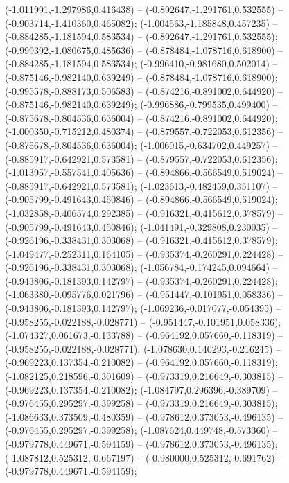  (-1.011991,-1.297986,0.416438) -- (-0.892647,-1.291761,0.532555) -- (-0.903714,-1.410360,0.465082);
 (-1.004563,-1.185848,0.457235) -- (-0.884285,-1.181594,0.583534) -- (-0.892647,-1.291761,0.532555);
 (-0.999392,-1.080675,0.485636) -- (-0.878484,-1.078716,0.618900) -- (-0.884285,-1.181594,0.583534);
 (-0.996410,-0.981680,0.502014) -- (-0.875146,-0.982140,0.639249) -- (-0.878484,-1.078716,0.618900);
 (-0.995578,-0.888173,0.506583) -- (-0.874216,-0.891002,0.644920) -- (-0.875146,-0.982140,0.639249);
 (-0.996886,-0.799535,0.499400) -- (-0.875678,-0.804536,0.636004) -- (-0.874216,-0.891002,0.644920);
 (-1.000350,-0.715212,0.480374) -- (-0.879557,-0.722053,0.612356) -- (-0.875678,-0.804536,0.636004);
 (-1.006015,-0.634702,0.449257) -- (-0.885917,-0.642921,0.573581) -- (-0.879557,-0.722053,0.612356);
 (-1.013957,-0.557541,0.405636) -- (-0.894866,-0.566549,0.519024) -- (-0.885917,-0.642921,0.573581);
 (-1.023613,-0.482459,0.351107) -- (-0.905799,-0.491643,0.450846) -- (-0.894866,-0.566549,0.519024);
 (-1.032858,-0.406574,0.292385) -- (-0.916321,-0.415612,0.378579) -- (-0.905799,-0.491643,0.450846);
 (-1.041491,-0.329808,0.230035) -- (-0.926196,-0.338431,0.303068) -- (-0.916321,-0.415612,0.378579);
 (-1.049477,-0.252311,0.164105) -- (-0.935374,-0.260291,0.224428) -- (-0.926196,-0.338431,0.303068);
 (-1.056784,-0.174245,0.094664) -- (-0.943806,-0.181393,0.142797) -- (-0.935374,-0.260291,0.224428);
 (-1.063380,-0.095776,0.021796) -- (-0.951447,-0.101951,0.058336) -- (-0.943806,-0.181393,0.142797);
 (-1.069236,-0.017077,-0.054395) -- (-0.958255,-0.022188,-0.028771) -- (-0.951447,-0.101951,0.058336);
 (-1.074327,0.061673,-0.133788) -- (-0.964192,0.057660,-0.118319) -- (-0.958255,-0.022188,-0.028771);
 (-1.078630,0.140293,-0.216245) -- (-0.969223,0.137354,-0.210082) -- (-0.964192,0.057660,-0.118319);
 (-1.082125,0.218596,-0.301609) -- (-0.973319,0.216649,-0.303815) -- (-0.969223,0.137354,-0.210082);
 (-1.084797,0.296396,-0.389709) -- (-0.976455,0.295297,-0.399258) -- (-0.973319,0.216649,-0.303815);
 (-1.086633,0.373509,-0.480359) -- (-0.978612,0.373053,-0.496135) -- (-0.976455,0.295297,-0.399258);
 (-1.087624,0.449748,-0.573360) -- (-0.979778,0.449671,-0.594159) -- (-0.978612,0.373053,-0.496135);
 (-1.087812,0.525312,-0.667197) -- (-0.980000,0.525312,-0.691762) -- (-0.979778,0.449671,-0.594159);
